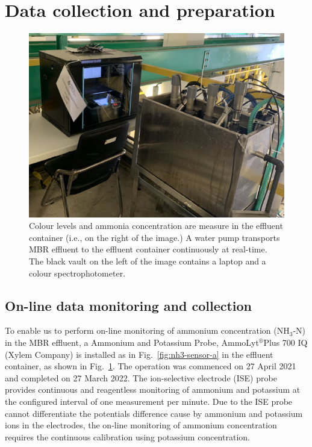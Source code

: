 \section{Data collection and preparation}

\begin{figure}[h]
    \centering
    \includegraphics[width=0.8\columnwidth]{imgs/instrument/sampling-tank.png}
    \caption{Colour levels and ammonia concentration are measure in the effluent container (i.e., on the right of the image.) A water pump transports MBR effluent to the effluent container continuously at real-time. The black vault on the left of the image contains a laptop and a colour spectrophotometer.} 
    \label{fig:sampling-tank}
 \end{figure}

\subsection{On-line data monitoring and collection}
To enable us to perform on-line monitoring of ammonium concentration (NH$_{3}$-N) in the MBR effluent, a Ammonium and Potassium Probe, AmmoLyt$^\circledR$Plus 700 IQ (Xylem Company) is installed as in Fig.~\ref{fig:nh3-sensor-a} in the effluent container, as shown in Fig.~\ref{fig:sampling-tank}. The operation was commenced on 27 April 2021 and completed on 27 March 2022. The ion-selective electrode (ISE) probe provides continuous and reagentless monitoring of ammonium and potassium at the configured interval of one measurement per minute. Due to the ISE probe cannot differentiate the potentials difference cause by ammonium and potassium ions in the electrodes, the on-line monitoring of ammonium concentration requires the continuous calibration using potassium concentration.


